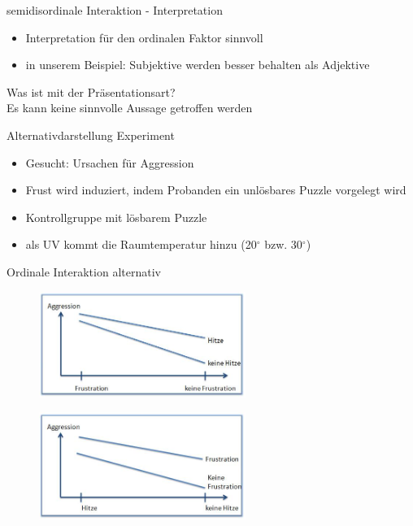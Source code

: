 \documentclass{beamer}
\begin{document}
	\begin{frame}{semidisordinale Interaktion - Interpretation}
		\begin{itemize}
			\item Interpretation für den ordinalen Faktor sinnvoll
			\item in unserem Beispiel: Subjektive werden besser behalten als Adjektive
		\end{itemize}
		\alert{Was ist mit der Präsentationsart?}
		\pause \\
		Es kann keine sinnvolle Aussage getroffen werden
	\end{frame}
	
	\begin{frame}{Alternativdarstellung}
		Experiment
		\begin{itemize}
			\item Gesucht: Ursachen für Aggression
			\item Frust wird induziert, indem Probanden ein unlösbares Puzzle vorgelegt wird
			\item Kontrollgruppe mit lösbarem Puzzle
			\item als UV kommt die Raumtemperatur hinzu (20$^{\circ}$ bzw. 30$^{\circ}$)
		\end{itemize}
	\end{frame}
	
	\begin{frame}{Ordinale Interaktion alternativ}
		\begin{figure}
			\centering
			\includegraphics[width=0.6\textwidth]{Bilder/OrdinaleInteraktion1.jpg}
		\end{figure}
		\begin{figure}
			\centering
			\includegraphics[width=0.6\textwidth]{Bilder/OrdinaleInteraktion2.jpg}
		\end{figure}
	\end{frame}
	
\end{document}
